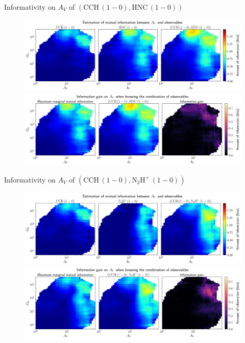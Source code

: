 \documentclass{beamer}
\begin{document}
\begin{frame}{Informativity on $A_V$ of $\left(\mathrm{CCH\,(1-0)},\mathrm{HNC\,(1-0)}\right)$}
    \begin{figure}
        \centering
        \includegraphics[width=0.95\linewidth]{../mi/av__cch10_hnc10_mi.png}
        \vfill
        \includegraphics[width=0.95\linewidth]{../mi/av__cch10_hnc10_mi_gain.png}
    \end{figure}
\end{frame}

\begin{frame}{Informativity on $A_V$ of $\left(\mathrm{CCH\,(1-0)},\mathrm{N_2H^+\,(1-0)}\right)$}
    \begin{figure}
        \centering
        \includegraphics[width=0.95\linewidth]{../mi/av__cch10_n2hp10_mi.png}
        \vfill
        \includegraphics[width=0.95\linewidth]{../mi/av__cch10_n2hp10_mi_gain.png}
    \end{figure}
\end{frame}
\end{document}
